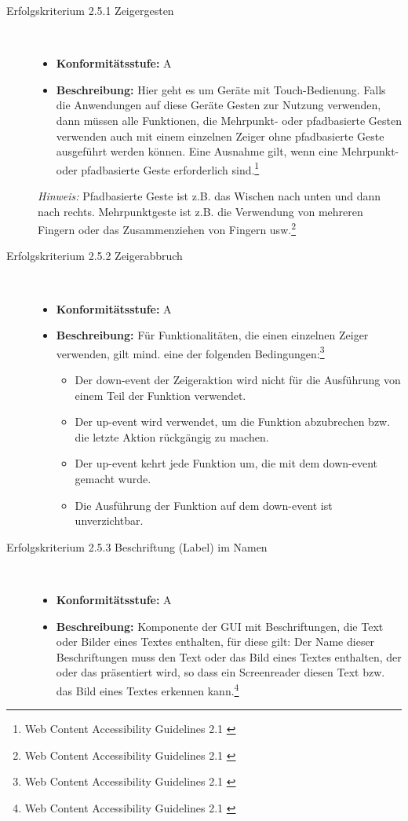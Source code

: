\begin{description}
\begin{description}
		\item [Erfolgskriterium 2.5.1 Zeigergesten]\hfill \\
		\begin{itemize}
			\item \textbf{Konformitätsstufe:} A
			\item \textbf{Beschreibung:} Hier geht es um Geräte mit Touch-Bedienung. Falls die Anwendungen auf diese Geräte Gesten zur Nutzung verwenden, dann müssen alle Funktionen, 
			die Mehrpunkt- oder pfadbasierte Gesten verwenden auch mit einem einzelnen Zeiger ohne pfadbasierte Geste ausgeführt werden können. Eine Ausnahme gilt, wenn eine 
			Mehrpunkt- oder pfadbasierte Geste erforderlich sind.\footnote{Web Content Accessibility Guidelines 2.1 \cite{WCAG2.1}}
		\end{itemize}
		
		\textit{Hinweis:} Pfadbasierte Geste ist z.B. das Wischen nach unten und dann nach rechts. Mehrpunktgeste ist z.B. die Verwendung von mehreren Fingern oder das Zusammenziehen von 
		Fingern usw.\footnote{Web Content Accessibility Guidelines 2.1 \cite{WCAG2.1}}
		
		\item [Erfolgskriterium 2.5.2 Zeigerabbruch]\hfill \\
		\begin{itemize}
			\item \textbf{Konformitätsstufe:} A
			\item \textbf{Beschreibung:} Für Funktionalitäten, die einen einzelnen Zeiger verwenden, gilt mind. eine der folgenden 
			Bedingungen:\footnote{Web Content Accessibility Guidelines 2.1 \cite{WCAG2.1}}
			\begin{itemize}
				\item Der down-event der Zeigeraktion wird nicht für die Ausführung von einem Teil der Funktion verwendet.
				\item Der up-event wird verwendet, um die Funktion abzubrechen bzw. die letzte Aktion rückgängig zu machen.
				\item Der up-event kehrt jede Funktion um, die mit dem down-event gemacht wurde.
				\item Die Ausführung der Funktion auf dem down-event ist unverzichtbar.
			\end{itemize}
		\end{itemize}
		
		\item [Erfolgskriterium 2.5.3 Beschriftung (Label) im Namen]\hfill \\
		\begin{itemize}
			\item \textbf{Konformitätsstufe:} A
			\item \textbf{Beschreibung:} Komponente der \ac{GUI} mit Beschriftungen, die Text oder Bilder eines Textes enthalten, für diese gilt: Der Name
			dieser Beschriftungen muss den Text oder das Bild eines Textes enthalten, der oder das präsentiert wird, so dass ein Screenreader diesen Text bzw. das Bild eines Textes 
			erkennen kann.\footnote{Web Content Accessibility Guidelines 2.1 \cite{WCAG2.1}}
		\end{itemize}
		

\end{description}
\end{description}
